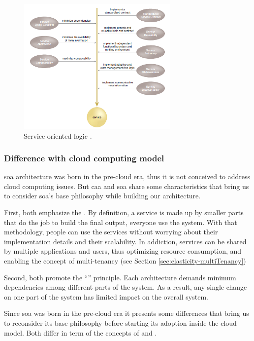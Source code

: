 \begin{figure}
	\centering{}
	\includegraphics[width=0.7\textwidth]{chapters/architecture/images/soa-characteristics.png}
	\caption[Service oriented logic]{Service oriented logic \cite{serviceCharacteristics}.}
	\label{img:architecture-soaRevisitation-characteristics}
\end{figure}

\subsubsection{Difference with cloud computing model}
\label{sec:architecture-soaRevisitation-compatibility}
\ac{soa} architecture was born in the pre-cloud era, thus it is not conceived to address cloud computing
issues. But \ac{caa} and \ac{soa} share some characteristics that bring us to consider \ac{soa}'s base
philosophy while building our architecture.

First, both emphasize the . By definition, a service is made up by smaller parts
that do the job to build the final output, everyone use the  system. With that methodology,
people can use the services without worrying about their implementation details and their scalability. In
addiction, services can be shared by multiple applications and users, thus optimizing resource consumption,
and enabling the concept of multi-tenancy (see Section \ref{sec:elasticity-multiTenancy})

Second, both promote the ``'' principle. Each architecture demands minimum
dependencies among different parts of the system. As a result, any single change on one part of the system
has limited impact on the overall system.

Since \ac{soa} was born in the pre-cloud era it presents some differences that bring us to reconsider its
base philosophy before starting its adoption inside the cloud model. Both differ in term of the concepts
of  and .

